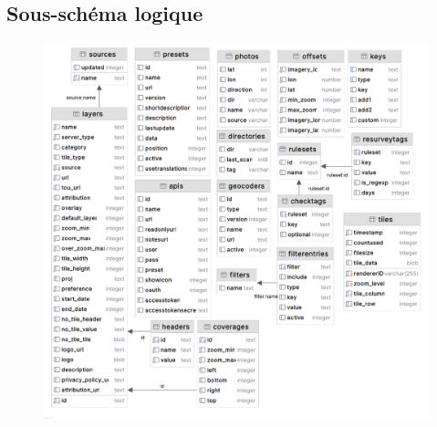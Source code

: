 \subsection{Sous-schéma logique}
\begin{figure}[!ht]
    \centering
    \includegraphics[scale=1]{images/sous_schema_logique.png}
    \label{fig:sous schéma logique}
\end{figure}
